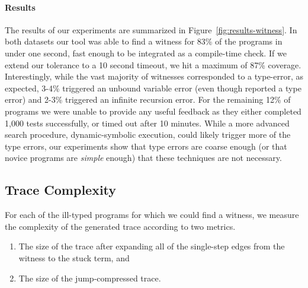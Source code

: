 \paragraph{Results}
\label{sec:results-witness}
The results of our experiments are summarized in
Figure~\ref{fig:results-witness}.
%
In both datasets our tool was able to find a witness for 83\% of the
programs in under one second, \ie fast enough to be integrated as a
compile-time check. If we extend our tolerance to a 10 second timeout,
we hit a maximum of 87\% coverage.
%
Interestingly, while the vast majority of witnesses corresponded to a
type-error, as expected, 3-4\% triggered an unbound variable error (even
though \ocaml reported a type error) and 2-3\% triggered an infinite
recursion error.
%
For the remaining 12\% of programs we were unable to provide any useful
feedback as they either completed 1,000 tests successfully, or timed out
after 10 minutes.
%
%
While a more advanced search procedure, \eg dynamic-symbolic execution,
could likely trigger more of the type errors, our experiments show that
type errors are coarse enough (or that novice programs are \emph{simple}
enough) that these techniques are not necessary.


\subsection{Trace Complexity}
\label{sec:trace-complexity}

For each of the ill-typed programs for which we could
find a witness, we measure the complexity of the generated
trace according to two metrics.

%
\begin{enumerate}
\item {} The size of the trace after expanding
  all of the single-step edges from the witness to the stuck term, and
\item {} The size of the jump-compressed trace.
\end{enumerate}


